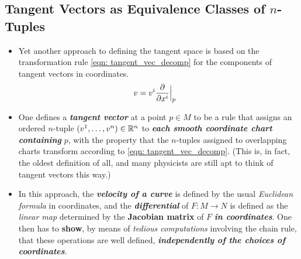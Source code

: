 \documentclass[11pt]{article}
\begin{document}
\subsection{Tangent Vectors as Equivalence Classes of $n$-Tuples}
\begin{itemize}
\item Yet another approach to defining the tangent space is based on the transformation rule \eqref{eqn: tangent_vec_decomp} for the components of tangent vectors in coordinates.
\begin{align*}
v&=v^{i} \frac{\partial }{ \partial x^{i}}\Bigr|_{p} 
\end{align*}

\item One defines a \emph{\textbf{tangent vector}} at a point $p \in M$ to be a rule that assigns an ordered $n$-tuple $(v^1,\ldots, v^n) \in {\mathbb R}^n$ to \emph{\textbf{each smooth coordinate chart containing}} $p$, with the property that the $n$-tuples assigned to overlapping charts transform according to \eqref{eqn: tangent_vec_decomp}. (This is, in fact, the oldest definition of all, and many physicists are still apt to think of tangent vectors this way.)

\item In this approach, the \emph{\textbf{velocity of a curve}} is defined by the usual \emph{Euclidean formula} in coordinates, and the \emph{\textbf{differential}} of $F: M \rightarrow N$ is defined as the \emph{linear map} determined by the \textbf{Jacobian matrix} of $F$ \emph{\textbf{in coordinates}}. One then has to \textbf{show}, by means of \emph{tedious computations} involving the chain rule, that these operations are well defined, \emph{\textbf{independently of the choices of coordinates}}.
\end{itemize}
\newpage


\end{document}
